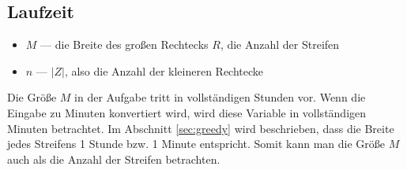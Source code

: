 \subsection{Laufzeit}
\begin{itemize}
	\item $M$ --- die Breite des großen Rechtecks $R$, die Anzahl der Streifen 
	\item $n$ --- $|Z|$, also die Anzahl der kleineren Rechtecke
\end{itemize}

Die Größe $M$ in der Aufgabe tritt in vollständigen Stunden vor.
Wenn die Eingabe zu Minuten konvertiert wird, wird diese Variable
in vollständigen Minuten betrachtet.
Im Abschnitt \cref{sec:greedy} wird beschrieben,
dass die Breite jedes Streifens 1 Stunde bzw. 1 Minute entspricht.
Somit kann man die Größe $M$ auch als die Anzahl der Streifen betrachten.


